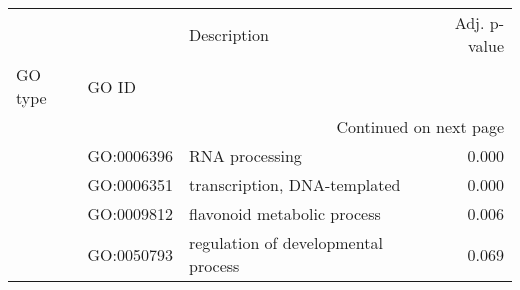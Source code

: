 \begin{longtable}{lllr}
\toprule
   &            &                          Description &  Adj. p-value \\
GO type & GO ID &                                      &               \\
\midrule
\endhead
\midrule
\multicolumn{4}{r}{{Continued on next page}} \\
\midrule
\endfoot

\bottomrule
\endlastfoot
\multirow{4}{*}{BP} & GO:0006396 &                       RNA processing &         0.000 \\
   & GO:0006351 &         transcription, DNA-templated &         0.000 \\
   & GO:0009812 &          flavonoid metabolic process &         0.006 \\
   & GO:0050793 &  regulation of developmental process &         0.069 \\
\end{longtable}
